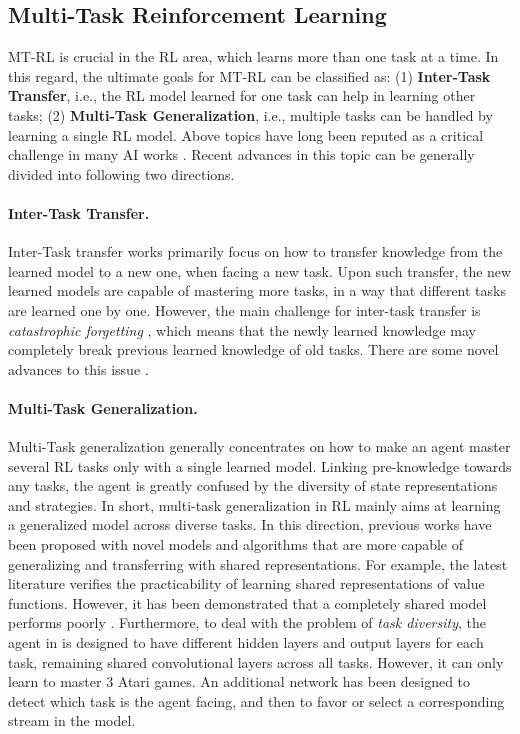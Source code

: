 \documentclass[letterpaper]{article} %
\begin{document}
\subsection{Multi-Task Reinforcement Learning}
MT-RL is crucial in the RL area, which learns more than one task at a time. In this regard, the ultimate goals for MT-RL can be classified as:
(1) \textbf{Inter-Task Transfer}, i.e., the RL model learned for one task can help in learning other tasks;
(2) \textbf{Multi-Task Generalization}, i.e.,  multiple tasks can be handled by learning a single RL model.
Above topics have long been reputed as a critical challenge in many AI works \cite{ring1994continual,silver2013lifelong,taylor2011introduction}. Recent advances in this topic can be generally divided into following two directions.

\paragraph{Inter-Task Transfer.}
Inter-Task transfer works primarily focus on how to transfer knowledge from the learned model to a new one, when facing a new task.
Upon such transfer, the new learned models are capable of mastering more tasks, in a way that different tasks are learned one by one.
However, the main challenge for inter-task transfer is \textit{catastrophic forgetting} \cite{mccloskey1989catastrophic,mcclelland1995there,ratcliff1990connectionist}, which means that the newly learned knowledge may completely break previous learned knowledge of old tasks. There are some novel advances to this issue  \cite{rusu2016progressive,fahlman1990cascade,kirkpatrick2017overcoming,rusu2015policy,terekhov2015knowledge,parisotto16_actormimic}.

\paragraph{Multi-Task Generalization.} Multi-Task generalization \cite{borsa2016learning,romoff2016deep,sermanet2016unsupervised} generally concentrates on how to make an agent master several RL tasks only with a single learned model. Linking pre-knowledge towards any tasks, the agent is greatly confused by the diversity of state representations and strategies. In short, multi-task generalization in RL mainly aims at learning a generalized model across diverse tasks. In this direction, previous works have been proposed with novel models and algorithms that are more capable of generalizing and transferring with shared representations. For example, the latest literature \cite{borsa2016learning} verifies the practicability of learning shared representations of value functions. However, it has been demonstrated that a completely shared model performs poorly \cite{romoff2016deep}. Furthermore, to deal with the problem of \textit{task diversity}, the agent in \cite{romoff2016deep} is designed to have different hidden layers and output layers for each task, remaining shared convolutional layers across all tasks. However, it can only learn to master 3 Atari games. An additional network \cite{sermanet2016unsupervised} has been designed to detect which task is the agent facing, and then to favor or select a corresponding stream in the model.
\end{document}
